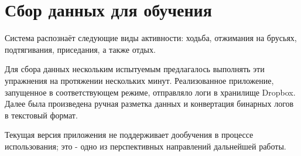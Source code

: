 
\section{Сбор данных для обучения}

Система распознаёт следующие виды активности: ходьба, отжимания на брусьях, подтягивания, приседания, а также отдых.

Для сбора данных нескольким испытуемым предлагалось выполнять эти упражнения на протяжении нескольких минут. Реализованное приложение, запущенное в соответствующем режиме, отправляло логи в хранилище Dropbox. Далее была произведена ручная разметка данных и конвертация бинарных логов в текстовый формат. 

Текущая версия приложения не поддерживает дообучения в процессе использования; это - одно из перспективных направлений дальнейшей работы. 




